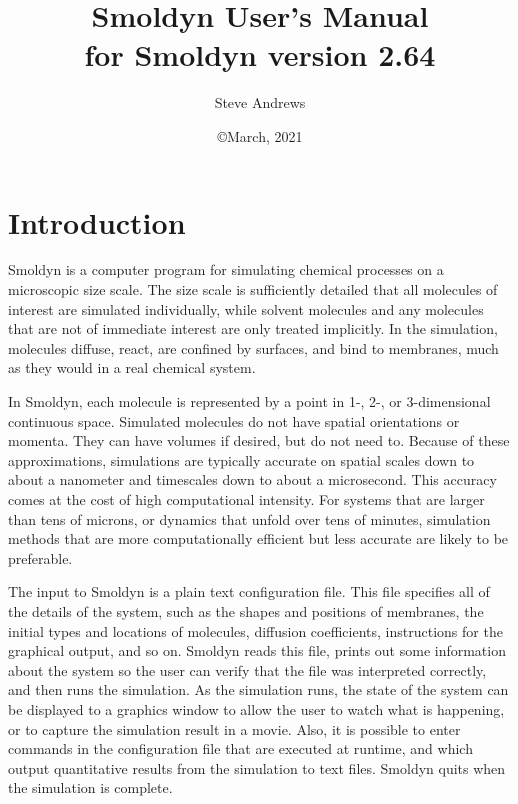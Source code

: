 \documentclass {book}
\begin{document}



\title{\textbf{Smoldyn User's Manual} \\ \large for Smoldyn version 2.64}
\date{\copyright March, 2021}
\author{Steve Andrews}
\maketitle

\tableofcontents



\chapter{Introduction}

Smoldyn is a computer program for simulating chemical processes on a microscopic size scale. The size scale is sufficiently detailed that all molecules of interest are simulated individually, while solvent molecules and any molecules that are not of immediate interest are only treated implicitly. In the simulation, molecules diffuse, react, are confined by surfaces, and bind to membranes, much as they would in a real chemical system.

In Smoldyn, each molecule is represented by a point in 1-, 2-, or 3-dimensional continuous space. Simulated molecules do not have spatial orientations or momenta. They can have volumes if desired, but do not need to. Because of these approximations, simulations are typically accurate on spatial scales down to about a nanometer and timescales down to about a microsecond. This accuracy comes at the cost of high computational intensity. For systems that are larger than tens of microns, or dynamics that unfold over tens of minutes, simulation methods that are more computationally efficient but less accurate are likely to be preferable.

The input to Smoldyn is a plain text configuration file. This file specifies all of the details of the system, such as the shapes and positions of membranes, the initial types and locations of molecules, diffusion coefficients, instructions for the graphical output, and so on. Smoldyn reads this file, prints out some information about the system so the user can verify that the file was interpreted correctly, and then runs the simulation. As the simulation runs, the state of the system can be displayed to a graphics window to allow the user to watch what is happening, or to capture the simulation result in a movie. Also, it is possible to enter commands in the configuration file that are executed at runtime, and which output quantitative results from the simulation to text files. Smoldyn quits when the simulation is complete.
\end{document}
